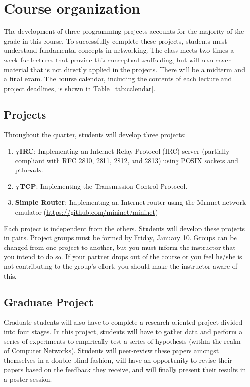 \documentclass[11pt]{article}
\newcommand{\chirc}{$\chi$\textsf{IRC}}
\newcommand{\chitcp}{$\chi$\textsf{TCP}}
\begin{document}
\section{Course organization}

The development of three programming projects accounts for the majority of the grade in this course. To successfully complete these projects, students must understand fundamental concepts in networking. The class meets two times a week for lectures that provide this conceptual scaffolding, but will also cover material that is not directly applied in the projects. There will be a midterm and a final exam. The course calendar, including the contents of each lecture and project deadlines, is shown in Table~\ref{tab:calendar}.

\subsection{Projects}

Throughout the quarter, students will develop three projects:

\begin{enumerate}
 \item \textbf{\chirc}: Implementing an Internet Relay Protocol (IRC) server (partially compliant with RFC 2810, 2811, 2812, and 2813) using POSIX sockets and pthreads.
 \item \textbf{\chitcp}: Implementing the Transmission Control Protocol.
 \item \textbf{Simple Router}: Implementing an Internet router using the Mininet network emulator (\url{https://github.com/mininet/mininet})
\end{enumerate}

Each project is independent from the others. Students will develop these projects in pairs. Project groups must be formed by Friday, January 10. Groups can be changed from one project to another, but you must inform the instructor that you intend to do so. If your partner drops out of the course or you feel he/she is not contributing to the group's effort, you should make the instructor aware of this.

\subsection{Graduate Project}

Graduate students will also have to complete a research-oriented project divided into four stages. In this project, students will have to gather data and perform a series of experiments to empirically test a series of hypothesis (within the realm of Computer Networks). Students will peer-review these papers amongst themselves in a double-blind fashion, will have an opportunity to revise their papers based on the feedback they receive, and will finally present their results in a poster session.
\end{document}
